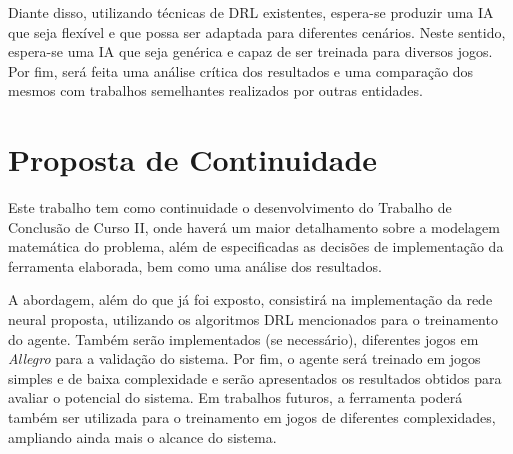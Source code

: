 Diante disso, utilizando técnicas de DRL existentes, espera-se produzir uma IA que seja flexível e que possa ser adaptada para diferentes cenários. Neste sentido, espera-se uma IA que seja genérica e capaz de ser treinada para diversos jogos. Por fim, será feita uma análise crítica dos resultados e uma comparação dos mesmos com trabalhos semelhantes realizados por outras entidades.
\clearpage
\section{Proposta de Continuidade} %
\label{sec:proposta_de_continuidade}

Este trabalho tem como continuidade o desenvolvimento do Trabalho de Conclusão de Curso II, onde haverá um maior detalhamento sobre a modelagem matemática do problema, além de especificadas as decisões de implementação da ferramenta elaborada, bem como uma análise dos resultados.

A abordagem, além do que já foi exposto, consistirá na implementação da rede neural proposta, utilizando os algoritmos DRL mencionados para o treinamento do agente. Também serão implementados (se necessário), diferentes jogos em \textit{Allegro} para a validação do sistema. Por fim, o agente será treinado em jogos simples e de baixa complexidade e serão apresentados os resultados obtidos para avaliar o potencial do sistema. Em trabalhos futuros, a ferramenta poderá também ser utilizada para o treinamento em jogos de diferentes complexidades, ampliando ainda mais o alcance do sistema.


